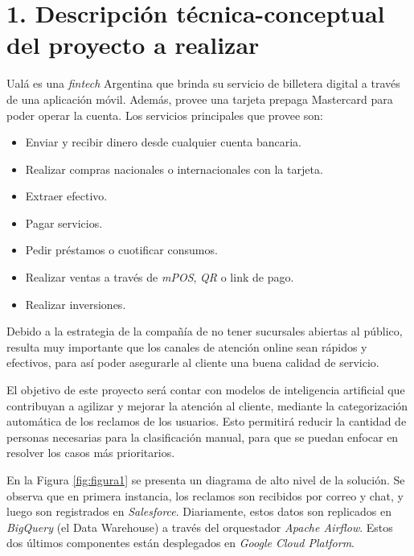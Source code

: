 \documentclass[
11pt, %
]{charter}
\begin{document}
\section{1. Descripción técnica-conceptual del proyecto a realizar}
\label{sec:descripcion}



Ualá es una \textit{fintech} Argentina que brinda su servicio de billetera digital a través de una aplicación móvil. Además, provee una tarjeta prepaga Mastercard para poder operar la cuenta. Los servicios principales que provee son:
\begin{itemize}
	\item Enviar y recibir dinero desde cualquier cuenta bancaria.
	\item Realizar compras nacionales o internacionales con la tarjeta.
	\item Extraer efectivo.
	\item Pagar servicios.
	\item Pedir préstamos o cuotificar consumos.
	\item Realizar ventas a través de \textit{mPOS}, \textit{QR} o link de pago.
	\item Realizar inversiones.
\end{itemize}

Debido a la estrategia de la compañía de no tener sucursales abiertas al público, resulta muy importante que los canales de atención online sean rápidos y efectivos, para así poder asegurarle al cliente una buena calidad de servicio.

El objetivo de este proyecto será contar con modelos de inteligencia artificial que contribuyan a agilizar y mejorar la atención al cliente, mediante la categorización automática de los reclamos de los usuarios. Esto permitirá reducir la cantidad de personas necesarias para la clasificación manual, para que se puedan enfocar en resolver los casos más prioritarios.

En la Figura \ref{fig:figura1} se presenta un diagrama de alto nivel de la solución. Se observa que en primera instancia, los reclamos son recibidos por correo y chat, y luego son registrados en \textit{Salesforce}.
Diariamente, estos datos son replicados en \textit{BigQuery} (el Data Warehouse) a través del orquestador \textit{Apache Airflow}. Estos dos últimos componentes están desplegados en \textit{Google Cloud Platform}. 
\end{document}
